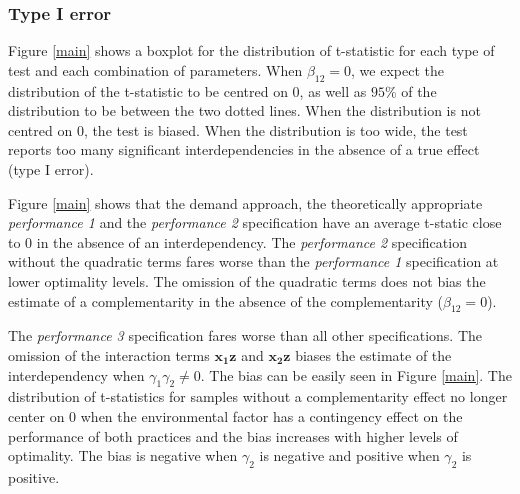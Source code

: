 \documentclass[12pt]{article}
\begin{document}
\subsubsection{Type I error}\label{Type I error}
Figure \ref{main} shows a boxplot for the distribution of t-statistic for each type of test and each combination of parameters. When $\beta_{12} = 0$, we expect the distribution of the t-statistic to be centred on $0$, as well as $95\%$ of the distribution to be between the two dotted lines. When the distribution is not centred on $0$, the test is biased. When the distribution is too wide, the test reports too many significant interdependencies in the absence of a true effect (type I error).

Figure \ref{main} shows that the demand approach, the theoretically appropriate \emph{performance 1} and the \emph{performance 2} specification have an average t-static close to 0 in the absence of an interdependency.
The \emph{performance 2} specification without the quadratic terms fares worse than the \emph{performance 1} specification at lower optimality levels. The omission of the quadratic terms does not bias the estimate of a complementarity in the absence of the complementarity ($\beta_{12} = 0$).

The \emph{performance 3}  specification fares worse than all other specifications. The omission of the interaction terms \(\mathbf{x_1z}\) and \(\mathbf{x_2z}\) biases the estimate of the interdependency when $\gamma_1 \gamma_2 \neq 0$. The bias can be easily seen in Figure \ref{main}. The distribution of t-statistics for samples without a complementarity effect no longer center on $0$ when the environmental factor has a contingency effect on the performance of both practices and the bias increases with higher levels of optimality. The bias is negative when $\gamma_2$ is negative and positive when $\gamma_2$ is positive.
\end{document}
